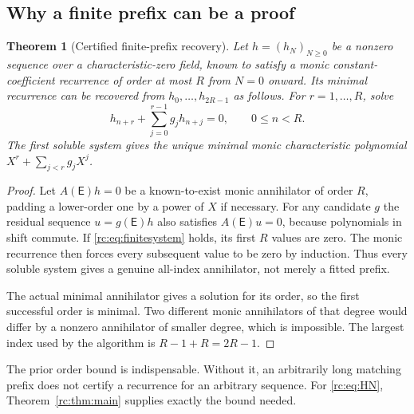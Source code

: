 \documentclass[11pt,a4paper]{article}
\numberwithin{equation}{section}
\newtheorem{theorem}{Theorem}[section]
\theoremstyle{definition}
\theoremstyle{remark}
\newcommand{\E}{\mathsf E}
\begin{document}
\subsection{Why a finite prefix can be a proof}
\begin{theorem}[Certified finite-prefix recovery]\label{rc:thm:finite}
Let $h=(h_N)_{N\ge0}$ be a nonzero sequence over a characteristic-zero
field, known to satisfy a monic constant-coefficient recurrence of
order at most $R$ from $N=0$ onward.  Its minimal recurrence can be
recovered from $h_0,\ldots,h_{2R-1}$ as follows.
For $r=1,\ldots,R$, solve
\begin{equation}\label{rc:eq:finitesystem}
 h_{n+r}+\sum_{j=0}^{r-1}g_j h_{n+j}=0,
                  \qquad 0\le n<R.
\end{equation}
The first soluble system gives the unique minimal monic characteristic
polynomial $X^r+\sum_{j<r}g_jX^j$.
\end{theorem}
\begin{proof}
Let $A(\E)h=0$ be a known-to-exist monic annihilator of order $R$,
padding a lower-order one by a power of $X$ if necessary.  For any
candidate $g$ the residual sequence $u=g(\E)h$ also satisfies
$A(\E)u=0$, because polynomials in shift commute.  If
\eqref{rc:eq:finitesystem} holds, its first $R$ values are zero.  The
monic recurrence then forces every subsequent value to be zero by
induction.  Thus every soluble system gives a genuine all-index
annihilator, not merely a fitted prefix.

The actual minimal annihilator gives a solution for its order, so the
first successful order is minimal.  Two different monic annihilators
of that degree would differ by a nonzero annihilator of smaller degree,
which is impossible.  The largest index used by the algorithm is
$R-1+R=2R-1$.
\end{proof}

The prior order bound is indispensable.  Without it, an arbitrarily long
matching prefix does not certify a recurrence for an arbitrary sequence.
For \eqref{rc:eq:HN}, Theorem~\ref{rc:thm:main} supplies exactly the bound needed.
\end{document}
